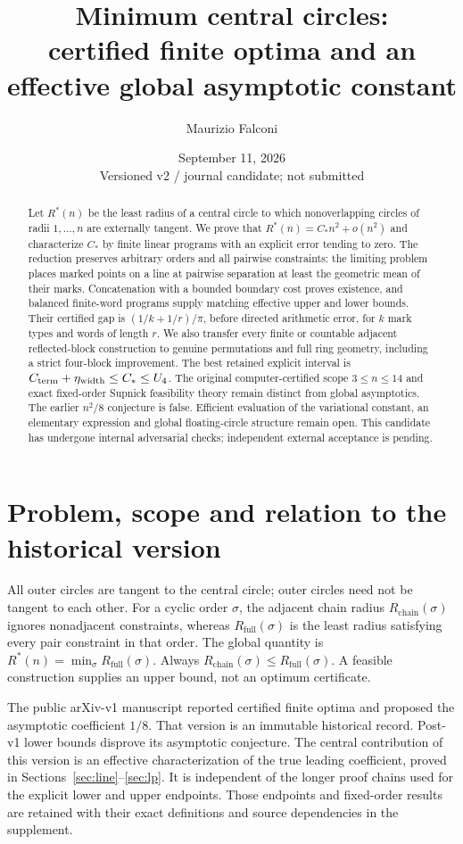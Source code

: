 \documentclass[11pt]{article}
\title{Minimum central circles:\\certified finite optima and an effective global asymptotic constant}
\author{Maurizio Falconi}
\date{September 11, 2026\\\small Versioned v2 / journal candidate; not submitted}
\theoremstyle{definition}\newtheorem{definition}[theorem]{Definition}
\theoremstyle{remark}\newtheorem{remark}[theorem]{Remark}
\newcommand{\Rstar}{R^\ast}
\newcommand{\ch}{R_{\mathrm{chain}}}
\newcommand{\full}{R_{\mathrm{full}}}
\newcommand{\CC}{C_\ast}
\begin{document}
\maketitle
\begin{abstract}
Let $\Rstar(n)$ be the least radius of a central circle to which nonoverlapping
circles of radii $1,\ldots,n$ are externally tangent. We prove that
$\Rstar(n)=\CC n^2+o(n^2)$ and characterize $\CC$ by finite linear programs
with an explicit error tending to zero. The reduction preserves arbitrary
orders and all pairwise constraints: the limiting problem places marked
points on a line at pairwise separation at least the geometric mean of their
marks. Concatenation with a bounded boundary cost proves existence, and
balanced finite-word programs supply matching effective upper and lower
bounds. Their certified gap is $(1/k+1/r)/\pi$, before directed arithmetic
error, for $k$ mark types and words of length $r$.
We also transfer every finite or countable adjacent reflected-block
construction to genuine permutations and full ring geometry, including a
strict four-block improvement. The best retained explicit interval is
$C_{\rm term}+\eta_{\rm width}\le\CC\le U_4$.
The original computer-certified scope $3\le n\le14$ and exact fixed-order
Supnick feasibility theory remain distinct from global asymptotics.
The earlier $n^2/8$ conjecture is false. Efficient evaluation of the
variational constant, an elementary expression and global floating-circle
structure remain open. This candidate has undergone internal adversarial
checks; independent external acceptance is pending.
\end{abstract}

\section{Problem, scope and relation to the historical version}

All outer circles are tangent to the central circle; outer circles need
not be tangent to each other. For a cyclic order $\sigma$, the adjacent
chain radius $\ch(\sigma)$ ignores nonadjacent constraints, whereas
$\full(\sigma)$ is the least radius satisfying every pair constraint in
that order. The global quantity is $\Rstar(n)=\min_\sigma\full(\sigma)$.
Always $\ch(\sigma)\le\full(\sigma)$. A feasible construction supplies
an upper bound, not an optimum certificate.

The public arXiv-v1 manuscript \cite{v1} reported certified finite optima
and proposed the asymptotic coefficient $1/8$. That version is an immutable
historical record. Post-v1 lower bounds disprove its asymptotic conjecture.
The central contribution of this version is an effective characterization
of the true leading coefficient, proved in Sections~\ref{sec:line}--\ref{sec:lp}.
It is independent of the longer proof chains used for the explicit lower
and upper endpoints. Those endpoints and fixed-order results are retained
with their exact definitions and source dependencies in the supplement.
\end{document}
